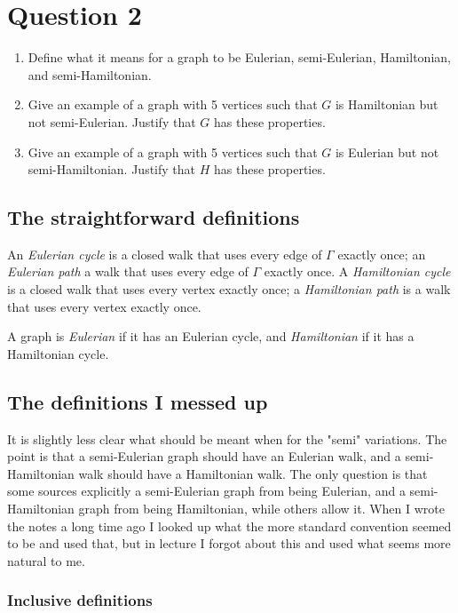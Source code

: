 \documentclass{amsart}
\begin{document}
    
\section*{Question 2}

\begin{enumerate}[label=\alph*)]
\item  Define what it means for a graph to be Eulerian, semi-Eulerian, Hamiltonian, and semi-Hamiltonian.
\item Give an example of a graph with 5 vertices such that $G$ is Hamiltonian but not semi-Eulerian.  Justify that $G$ has these properties.
\item Give an example of a graph with 5 vertices such that $G$ is Eulerian but not semi-Hamiltonian.  Justify that $H$ has these properties.
\end{enumerate}

\subsection*{The straightforward definitions}
An \emph{Eulerian cycle} is a closed walk that uses every edge of $\Gamma$ exactly once; an \emph{Eulerian path} a walk that uses every edge of $\Gamma$ exactly once. A \emph{Hamiltonian cycle} is a closed walk that uses every vertex exactly once; a \emph{Hamiltonian path} is a walk that uses every vertex exactly once.

A graph is \emph{Eulerian} if it has an Eulerian cycle, and \emph{Hamiltonian} if it has a Hamiltonian cycle.  

\subsection*{The definitions I messed up}

It is slightly less clear what should be meant when for the "semi" variations.  The point is that a semi-Eulerian graph should have an Eulerian walk, and a semi-Hamiltonian walk should have a Hamiltonian walk.  The only question is that some sources explicitly a semi-Eulerian graph from being Eulerian, and a semi-Hamiltonian graph from being Hamiltonian, while others allow it.  When I wrote the notes a long time ago I looked up what the more standard convention seemed to be and used that, but in lecture I forgot about this and used what seems more natural to me.

\subsubsection*{Inclusive definitions}
\end{document}

